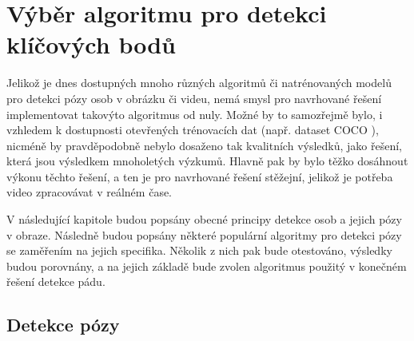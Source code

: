 \chapter{Výběr algoritmu pro detekci klíčových bodů}
\label{chap:Pose}

Jelikož je dnes dostupných mnoho různých algoritmů či natrénovaných modelů pro
detekci pózy osob v obrázku či videu, nemá smysl pro navrhované řešení
implementovat takovýto algoritmus od nuly. Možné by to samozřejmě bylo, i
vzhledem k dostupnosti otevřených trénovacích dat (např. dataset COCO
\cite{coco}), nicméně by pravděpodobně nebylo dosaženo tak kvalitních výsledků,
jako řešení, která jsou výsledkem mnoholetých výzkumů. Hlavně pak by bylo těžko
dosáhnout výkonu těchto řešení, a ten je pro navrhované řešení stěžejní,
jelikož je potřeba video zpracovávat v reálném čase.

V následující kapitole budou popsány obecné principy detekce osob a jejich pózy
v obraze. Následně budou popsány některé populární algoritmy pro detekci pózy
se zaměřením na jejich specifika. Několik z nich pak bude otestováno, výsledky
budou porovnány, a na jejich základě bude zvolen algoritmus použitý v konečném
řešení detekce pádu.

\section{Detekce pózy}


